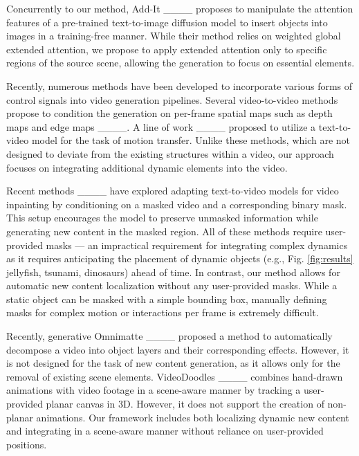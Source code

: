 Concurrently to our method, Add-It ____ proposes to manipulate the attention features of a pre-trained text-to-image diffusion model to insert objects into images in a training-free manner. While their method relies on weighted global extended attention, we propose to apply extended attention only to specific regions of the source scene, allowing the generation to focus on essential elements.



Recently, numerous methods have been developed to incorporate various forms of control signals into video generation pipelines.
Several video-to-video methods propose to condition the generation on per-frame spatial maps such as depth maps and edge maps ____. A line of work ____ proposed to utilize a text-to-video model for the task of motion transfer. Unlike these methods, which are not designed to deviate from the existing structures within a video, our approach focuses on integrating additional dynamic elements into the video. 

Recent methods ____ have explored adapting text-to-video models for video inpainting by conditioning on a masked video and a corresponding binary mask. This setup encourages the model to preserve unmasked information while generating new content in the masked region. All of these methods require user-provided masks — an impractical requirement for integrating complex dynamics as it requires anticipating the placement of dynamic objects (e.g., Fig. \ref{fig:results} jellyfish, tsunami, dinosaurs) ahead of time. In contrast, our method allows for automatic new content localization without any user-provided masks. While a static object can be masked with a simple bounding box, manually defining masks for complex motion or interactions per frame is extremely difficult.

Recently, generative Omnimatte ____ proposed a method to automatically decompose a video into object layers and their corresponding effects. However, it is not designed for the task of new content generation, as it allows only for the removal of existing scene elements. VideoDoodles ____ combines hand-drawn animations with video footage in a scene-aware manner by tracking a user-provided planar canvas in 3D. However, it does not support the creation of non-planar animations. Our framework includes both localizing dynamic new content and integrating in a scene-aware manner without reliance on user-provided positions. 


